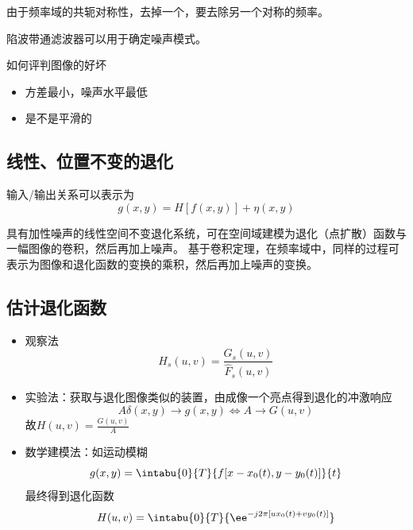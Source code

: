 由于频率域的共轭对称性，去掉一个，要去除另一个对称的频率。

陷波带通滤波器可以用于确定噪声模式。

如何评判图像的好坏
\begin{itemize}
\item 方差最小，噪声水平最低
\item 是不是平滑的
\end{itemize}

\subsection{线性、位置不变的退化}
输入/输出关系可以表示为
\[g(x,y)=H[f(x,y)]+\eta(x,y)\]

具有加性噪声的线性空间不变退化系统，可在空间域建模为退化（点扩散）函数与一幅图像的卷积，然后再加上噪声。
基于卷积定理，在频率域中，同样的过程可表示为图像和退化函数的变换的乘积，然后再加上噪声的变换。

\subsection{估计退化函数}
\begin{itemize}
	\item 观察法
	\[H_s(u,v)=\frac{G_s(u,v)}{\hat{F}_s(u,v)}\]
	\item 实验法：获取与退化图像类似的装置，由成像一个亮点得到退化的冲激响应
	\[A\delta(x,y)\to g(x,y)\iff A\to G(u,v)\]
	故$H(u,v)=\frac{G(u,v)}{A}$
	\item 数学建模法：如运动模糊
	\[g(x,y)=\intabu{0}{T}{f[x-x_0(t),y-y_0(t)]}{t}\]
	最终得到退化函数
	\[H(u,v)=\intabu{0}{T}{\ee^{-j2\pi[ux_0(t)+vy_0(t)]}}\]
\end{itemize}